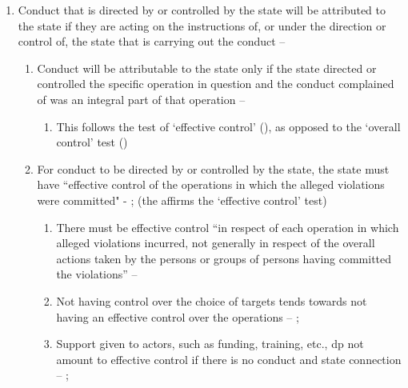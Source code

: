 \begin{enumerate}
\begin{enumerate}
\begin{enumerate}
        \end{enumerate}
        \item Conduct that is directed by or controlled by the state will be attributed to the state if they are acting on the instructions of, or under the direction or control of, the state that is carrying out the conduct -- 
        \begin{enumerate}
            \item Conduct will be attributable to the state only if the state directed or controlled the specific operation in question and the conduct complained of was an integral part of that operation -- 
            \begin{enumerate}
                \item This follows the test of `effective control' (), as opposed to the `overall control' test ()
            \end{enumerate}
            \item For conduct to be directed by or controlled by the state, the state must have ``effective control of the operations in which the alleged violations were committed" - ;  (the  affirms the `effective control' test)
            \begin{enumerate}
                \item There must be effective control ``in respect of each operation in which alleged violations incurred, not generally in respect of the overall actions taken by the persons or groups of persons having committed the violations'' -- 
                \item Not having control over the choice of targets tends towards not having an effective control over the operations -- ; 
                \item Support given to actors, such as funding, training, etc., dp not amount to effective control if there is no conduct and state connection -- ; 
            \end{enumerate}

\end{enumerate}
\end{enumerate}
\end{enumerate}

